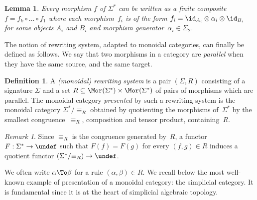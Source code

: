\documentclass[submission,copyright,creativecommons]{eptcs}
\let\C\undef
\newtheorem{lemma}[theorem]{Lemma}
\theoremstyle{definition}
\newtheorem{definition}[theorem]{Definition}
\theoremstyle{remark}
\newtheorem{remark}[theorem]{Remark}
\begin{document}
\begin{lemma}
  \label{lemma:free-moncat-slice}
  Every morphism $f$ of $\Sigma^*$ can be written as a finite composite
  $f=f_k\circ\ldots\circ f_1$ where each morphism~$f_i$ is of the form
  $f_i=\id_{A_i}\otimes\alpha_i\otimes\id_{B_i}$ for some objects $A_i$ and
  $B_i$ and morphism generator~$\alpha_i\in\Sigma_2$.
\end{lemma}

The notion of rewriting system, adapted to monoidal categories, can finally be
defined as follows. We say that two morphisms in a category are \emph{parallel}
when they have the same source, and the same target.

\begin{definition}
  A \emph{(monoidal) rewriting system} is a pair $(\Sigma,R)$ consisting of a
  signature $\Sigma$ and a set $R\subseteq\Mor(\Sigma^*)\times\Mor(\Sigma^*)$ of
  pairs of morphisms which are parallel. The monoidal category \emph{presented}
  by such a rewriting system is the monoidal category $\Sigma^*/{\equiv_R}$
  obtained by quotienting the morphisms of~$\Sigma^*$ by the smallest
  congruence~$\equiv_R$, \wrt composition and tensor product, containing~$R$.
\end{definition}

\begin{remark}
  \label{rem:free-moncat-rel}
  Since $\equiv_R$ is the congruence generated by~$R$, a functor
  $F:\Sigma^*\to\C$ such that $F(f)=F(g)$ for every $(f,g)\in R$ induces a
  quotient functor $(\Sigma^*/{\equiv_R})\to\C$.
\end{remark}

\noindent
We often write $\alpha\To\beta$ for a rule $(\alpha,\beta)\in R$. We recall
below the most well-known example of presentation of a monoidal category: the
simplicial category. It is fundamental since it is at the heart of simplicial
algebraic topology.
\end{document}
